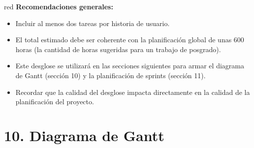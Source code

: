 \documentclass[
11pt, %
]{charter}
\begin{document}
\begin{consigna}{red}
\textbf{Recomendaciones generales:}
\begin{itemize}
  \item Incluir al menos dos tareas por historia de usuario.
  \item El total estimado debe ser coherente con la planificación global de unas 600 horas (la cantidad de horas sugeridas para un trabajo de posgrado).
  \item Este desglose se utilizará en las secciones siguientes para armar el diagrama de Gantt (sección 10) y la planificación de sprints (sección 11).
  \item Recordar que la calidad del desglose impacta directamente en la calidad de la planificación del proyecto.
\end{itemize}

\end{consigna} %


\section{10. Diagrama de Gantt}
\label{sec:gantt}
\end{document}
